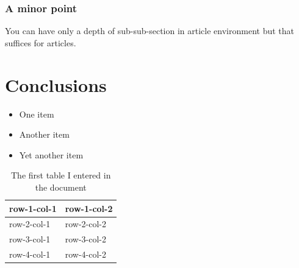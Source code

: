 \documentclass[a4paper, 12pt]{article}
\begin{document}
\subsubsection{A minor point}
You can have only a depth of sub-sub-section in article environment but that suffices for articles.


\section{Conclusions}

\begin{itemize}
	\item One item
	\item Another item
	\item Yet another item
\end{itemize}

\begin{table}
	\begin{center}
\begin{tabular}{|l|l|}
	\hline
	row-1-col-1 & row-1-col-2 \\
	\hline
	row-2-col-1 & row-2-col-2 \\
	row-3-col-1 & row-3-col-2 \\
	row-4-col-1 & row-4-col-2 \\
	\hline
\end{tabular}
	\caption{The first table I entered in the document}
	\label{tab:1}
	\end{center}
\end{table}

\vspace{56pt}



\end{document}

